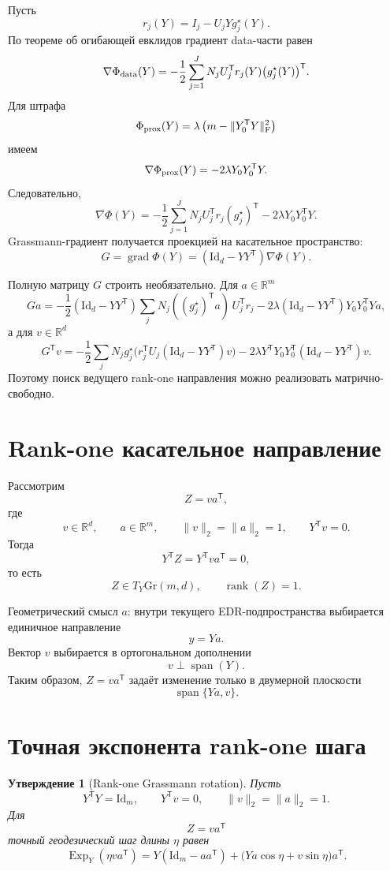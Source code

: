 \documentclass[11pt,a4paper]{article}
\newcommand{\R}{\mathbb R}
\newcommand{\T}{^{\mathsf T}}
\newcommand{\F}{_{\mathrm F}}
\newcommand{\Id}{\mathrm{Id}}
\newcommand{\Gr}{\mathrm{Gr}}
\newcommand{\Exp}{\operatorname{Exp}}
\newcommand{\grad}{\operatorname{grad}}
\newcommand{\spanop}{\operatorname{span}}
\DeclareMathOperator{\rank}{rank}
\newtheorem{proposition}{Утверждение}
\begin{document}
Пусть
\[
    r_j(Y)
    =
    I_j-U_jYg_j^\star(Y).
\]
По теореме об огибающей евклидов градиент data-части равен
\[
    \nabla \Phi_{\rm data}(Y)
    =
    -\frac12
    \sum_{j=1}^J
    N_j
    U_j\T r_j(Y)
    \bigl(g_j^\star(Y)\bigr)\T.
\]
Для штрафа
\[
    \Phi_{\rm prox}(Y)
    =
    \lambda
    \left(
        m-\|Y_0\T Y\|\F^2
    \right)
\]
имеем
\[
    \nabla\Phi_{\rm prox}(Y)
    =
    -2\lambda Y_0Y_0\T Y.
\]
Следовательно,
\[
    \nabla\Phi(Y)
    =
    -\frac12
    \sum_{j=1}^J
    N_j
    U_j\T r_j
    (g_j^\star)\T
    -
    2\lambda Y_0Y_0\T Y.
\]
Grassmann-градиент получается проекцией на касательное пространство:
\[
    \boxed{
    G
    =
    \grad\Phi(Y)
    =
    (\Id_d-YY\T)\nabla\Phi(Y).
    }
\]

Полную матрицу \(G\) строить необязательно. Для \(a\in\R^m\)
\[
    Ga
    =
    -\frac12
    (\Id_d-YY\T)
    \sum_j
    N_j
    ((g_j^\star)\T a)\,
    U_j\T r_j
    -
    2\lambda
    (\Id_d-YY\T)
    Y_0Y_0\T Ya,
\]
а для \(v\in\R^d\)
\[
    G\T v
    =
    -\frac12
    \sum_j
    N_j
    g_j^\star
    \bigl(r_j\T U_j(\Id_d-YY\T)v\bigr)
    -
    2\lambda
    Y\T Y_0Y_0\T
    (\Id_d-YY\T)v.
\]
Поэтому поиск ведущего rank-one направления можно реализовать
матрично-свободно.

\section{Rank-one касательное направление}

Рассмотрим
\[
    Z=va\T,
\]
где
\[
    v\in\R^d,
    \qquad
    a\in\R^m,
    \qquad
    \|v\|_2=\|a\|_2=1,
    \qquad
    Y\T v=0.
\]
Тогда
\[
    Y\T Z
    =
    Y\T va\T=0,
\]
то есть
\[
    Z\in T_Y\Gr(m,d),
    \qquad
    \rank(Z)=1.
\]

Геометрический смысл \(a\): внутри текущего EDR-подпространства
выбирается единичное направление
\[
    y=Ya.
\]
Вектор \(v\) выбирается в ортогональном дополнении
\[
    v\perp\spanop(Y).
\]
Таким образом, \(Z=va\T\) задаёт изменение только в двумерной плоскости
\[
    \spanop\{Ya,v\}.
\]

\section{Точная экспонента rank-one шага}

\begin{proposition}[Rank-one Grassmann rotation]
Пусть
\[
    Y\T Y=\Id_m,
    \qquad
    Y\T v=0,
    \qquad
    \|v\|_2=\|a\|_2=1.
\]
Для
\[
    Z=va\T
\]
точный геодезический шаг длины \(\eta\) равен
\[
    \boxed{
    \Exp_Y(\eta va\T)
    =
    Y(\Id_m-aa\T)
    +
    \bigl(
        Ya\cos\eta+v\sin\eta
    \bigr)a\T.
    }
\]
\end{proposition}
\end{document}
